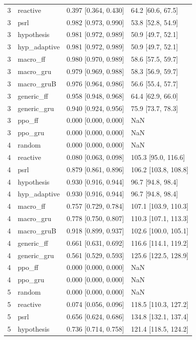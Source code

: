 \begin{tabular}{rlll}
3 & reactive & 0.397 [0.364, 0.430] & 64.2 [60.6, 67.5] \\
3 & psrl & 0.982 [0.973, 0.990] & 53.8 [52.8, 54.9] \\
3 & hypothesis & 0.981 [0.972, 0.989] & 50.9 [49.7, 52.1] \\
3 & hyp\_adaptive & 0.981 [0.972, 0.989] & 50.9 [49.7, 52.1] \\
3 & macro\_ff & 0.980 [0.970, 0.989] & 58.6 [57.5, 59.7] \\
3 & macro\_gru & 0.979 [0.969, 0.988] & 58.3 [56.9, 59.7] \\
3 & macro\_gruB & 0.976 [0.964, 0.986] & 56.6 [55.4, 57.7] \\
3 & generic\_ff & 0.958 [0.948, 0.968] & 64.4 [62.9, 66.0] \\
3 & generic\_gru & 0.940 [0.924, 0.956] & 75.9 [73.7, 78.3] \\
3 & ppo\_ff & 0.000 [0.000, 0.000] & NaN \\
3 & ppo\_gru & 0.000 [0.000, 0.000] & NaN \\
4 & random & 0.000 [0.000, 0.000] & NaN \\
4 & reactive & 0.080 [0.063, 0.098] & 105.3 [95.0, 116.6] \\
4 & psrl & 0.879 [0.861, 0.896] & 106.2 [103.8, 108.8] \\
4 & hypothesis & 0.930 [0.916, 0.944] & 96.7 [94.8, 98.4] \\
4 & hyp\_adaptive & 0.930 [0.916, 0.944] & 96.7 [94.8, 98.4] \\
4 & macro\_ff & 0.757 [0.729, 0.784] & 107.1 [103.9, 110.3] \\
4 & macro\_gru & 0.778 [0.750, 0.807] & 110.3 [107.1, 113.3] \\
4 & macro\_gruB & 0.918 [0.899, 0.937] & 102.6 [100.0, 105.1] \\
4 & generic\_ff & 0.661 [0.631, 0.692] & 116.6 [114.1, 119.2] \\
4 & generic\_gru & 0.561 [0.529, 0.593] & 125.6 [122.5, 128.9] \\
4 & ppo\_ff & 0.000 [0.000, 0.000] & NaN \\
4 & ppo\_gru & 0.000 [0.000, 0.000] & NaN \\
5 & random & 0.000 [0.000, 0.000] & NaN \\
5 & reactive & 0.074 [0.056, 0.096] & 118.5 [110.3, 127.2] \\
5 & psrl & 0.656 [0.624, 0.686] & 134.8 [132.1, 137.4] \\
5 & hypothesis & 0.736 [0.714, 0.758] & 121.4 [118.5, 124.2] \\

\end{tabular}
